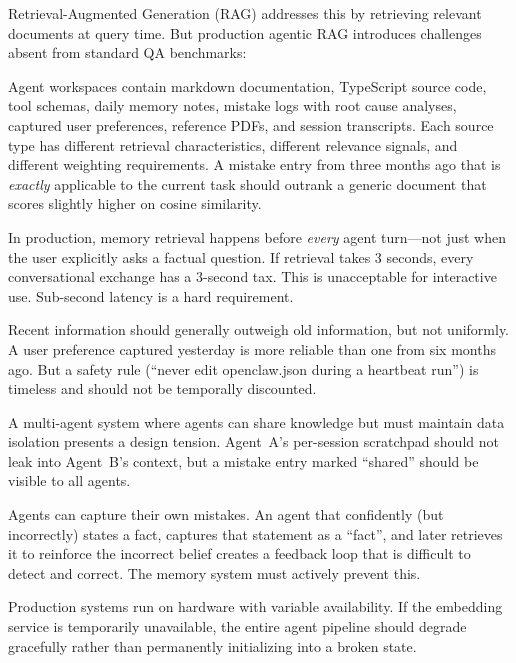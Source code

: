 \documentclass[11pt]{article}
\begin{document}
Retrieval-Augmented Generation (RAG) \citep{lewis2020rag} addresses this by retrieving
relevant documents at query time. But production agentic RAG introduces challenges
absent from standard QA benchmarks:

\begin{description}[leftmargin=1.5em, labelindent=0em, itemsep=4pt]
  \item[\textbf{Source heterogeneity.}] Agent workspaces contain markdown documentation,
  TypeScript source code, tool schemas, daily memory notes, mistake logs with root cause
  analyses, captured user preferences, reference PDFs, and session transcripts. Each
  source type has different retrieval characteristics, different relevance signals, and
  different weighting requirements. A mistake entry from three months ago that is
  \emph{exactly} applicable to the current task should outrank a generic document that
  scores slightly higher on cosine similarity.

  \item[\textbf{Latency constraints.}] In production, memory retrieval happens before
  \emph{every} agent turn---not just when the user explicitly asks a factual question.
  If retrieval takes 3 seconds, every conversational exchange has a 3-second tax. This
  is unacceptable for interactive use. Sub-second latency is a hard requirement.

  \item[\textbf{Temporal dynamics.}] Recent information should generally outweigh old
  information, but not uniformly. A user preference captured yesterday is more reliable
  than one from six months ago. But a safety rule (``never edit openclaw.json during a
  heartbeat run'') is timeless and should not be temporally discounted.

  \item[\textbf{Cross-agent sharing.}] A multi-agent system where agents can share
  knowledge but must maintain data isolation presents a design tension. Agent~A's
  per-session scratchpad should not leak into Agent~B's context, but a mistake entry
  marked ``shared'' should be visible to all agents.

  \item[\textbf{Self-poisoning.}] Agents can capture their own mistakes. An agent that
  confidently (but incorrectly) states a fact, captures that statement as a ``fact'',
  and later retrieves it to reinforce the incorrect belief creates a feedback loop that
  is difficult to detect and correct. The memory system must actively prevent this.

  \item[\textbf{Cold infrastructure.}] Production systems run on hardware with variable
  availability. If the embedding service is temporarily unavailable, the entire agent
  pipeline should degrade gracefully rather than permanently initializing into a broken
  state.
\end{description}
\end{document}

